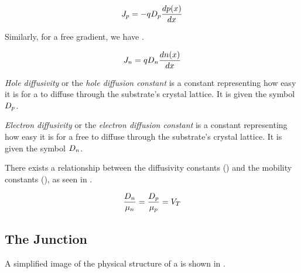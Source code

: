 \begin{equation}\label{eq:Diffusion_Current_Density-Hole}
  J_{p} = - q D_{p} \frac{d p(x)}{dx}
\end{equation}

Similarly, for a free  gradient, we have .

\begin{equation}\label{eq:Diffusion_Current_Density-Electron}
  J_{n} = q D_{n} \frac{d n(x)}{dx}
\end{equation}

\begin{definition}\label{def:Hole_Diffusivity}
  \emph{Hole diffusivity} or the \emph{hole diffusion constant} is a constant representing how easy it is for a  to diffuse through the substrate's crystal lattice.
  It is given the symbol $D_{p}$.
\end{definition}

\begin{definition}\label{def:Electron_Diffusivity}
  \emph{Electron diffusivity} or the \emph{electron diffusion constant} is a constant representing how easy it is for a free  to diffuse through the substrate's crystal lattice.
  It is given the symbol $D_{n}$.
\end{definition}

There exists a relationship between the diffusivity constants () and the mobility constants (), as seen in .

\begin{equation}\label{eq:Diffusivity_Mobility_Constants_Relation}
  \frac{D_{n}}{\mu_{n}} = \frac{D_{p}}{\mu_{p}} = V_{T}
\end{equation}

\subsection{The \PNJunction{} Junction}\label{subsec:The_pn_Junction}
A simplified image of the physical structure of a \PNJunction{} is shown in .

